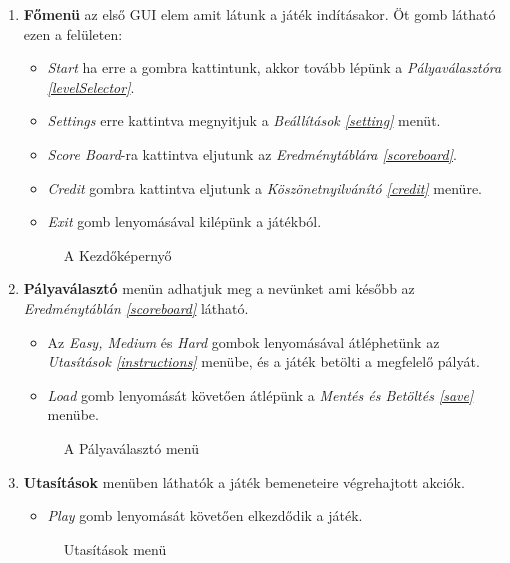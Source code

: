 \begin{enumerate}
	\item \label{fomenu} \textbf{Főmenü} az első GUI elem amit látunk a játék indításakor. Öt gomb látható ezen a felületen:
	\begin{itemize}
		\item \textit{Start} ha erre a gombra kattintunk, akkor tovább lépünk a \textit{Pályaválasztóra \ref{levelSelector}}.
		\item \textit{Settings} erre kattintva megnyitjuk a \textit{Beállítások \ref{setting}} menüt.
		\item \textit{Score Board}-ra kattintva eljutunk az \textit{Eredménytáblára \ref{scoreboard}}.
		\item \textit{Credit} gombra kattintva eljutunk a \textit{Köszönetnyilvánító \ref{credit}} menüre.
		\item \textit{Exit} gomb lenyomásával kilépünk a játékból.
	\end{itemize}
	\begin{figure}[H]
		\noindent{}
		\caption{A Kezdőképernyő}
		\label{mainMenu}
	\end{figure}
	
	\item \label{levelSelector} \textbf{Pályaválasztó} menün  adhatjuk meg a nevünket ami később az \textit{Eredménytáblán \ref{scoreboard}} látható.
	\begin{itemize}
	\item Az \textit{Easy, Medium} és \textit{Hard} gombok lenyomásával átléphetünk az \textit{Utasítások \ref{instructions}} menübe, és a játék betölti a megfelelő pályát.
	\item \textit{Load} gomb lenyomását követően átlépünk a \textit{Mentés és Betöltés \ref{save}} menübe.
	\end{itemize}
	\begin{figure}[H]
		\noindent{}
		\caption{A Pályaválasztó menü}
		\label{levelSelection}
	\end{figure}
	
	\item \label{instructions} \textbf{Utasítások} menüben láthatók a játék bemeneteire végrehajtott akciók.
	\begin{itemize}
		\item \textit{Play} gomb lenyomását követően elkezdődik a játék.
	\end{itemize}
	\begin{figure}[H]
		\noindent{}
		\caption{Utasítások menü}
		\label{instructionsF}
	\end{figure}	
	

\end{enumerate}
